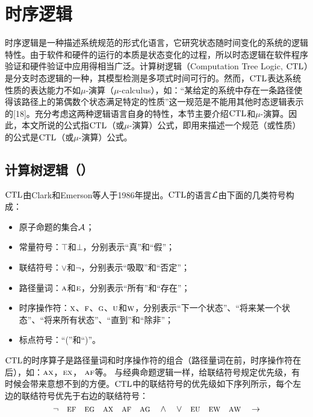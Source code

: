 \section{时序逻辑}
时序逻辑是一种描述系统规范的形式化语言，它研究状态随时间变化的系统的逻辑特性。由于软件和硬件的运行的本质是状态变化的过程，所以时态逻辑在软件程序验证和硬件验证中应用得相当广泛。计算树逻辑（Computation Tree Logic, $\textrm{CTL}$）是分支时态逻辑的一种，其模型检测是多项式时间可行的。然而，$\textrm{CTL}$表达系统性质的表达能力不如$\mu$-演算（$\mu$-calculus），如：“某给定的系统中存在一条路径使得该路径上的第偶数个状态满足特定的性质”这一规范是不能用其他时态逻辑表示的[18]。充分考虑这两种逻辑语言自身的特性，本节主要介绍$\textrm{CTL}$和$\mu$-演算。因此，本文所说的公式指$\textrm{CTL}$（或$\mu$-演算）公式，即用来描述一个规范（或性质）的公式是$\textrm{CTL}$（或$\mu$-演算）公式。

\subsection{计算树逻辑（\CTL）}
$\textrm{CTL}$由Clark和Emerson等人于1986年提出\cite{DBLP:journals/toplas/ClarkeES86}。$\textrm{CTL}$的语言${\cal L}$由下面的几类符号构成：
\begin{itemize}
	\item 原子命题的集合${\cal A}$；
	\item 常量符号：$\top$和$\bot$，分别表示“真”和“假”；
	\item 联结符号：$\vee$和$\neg$，分别表示“吸取”和“否定”；
	\item 路径量词：$\textsc{a}$和$\textsc{e}$，分别表示“所有”和“存在”；
	\item 时序操作符：$\textsc{x}$、$\textsc{f}$、$\textsc{g}$、$\textsc{u}$和$\textsc{w}$，分别表示“下一个状态”、“将来某一个状态”、“将来所有状态”、“直到”和“除非”；
	\item 标点符号：“(”和“)”。
\end{itemize}
$\textrm{CTL}$的时序算子是路径量词和时序操作符的组合（路径量词在前，时序操作符在后），如：$\textsc{a} \textsc{x}$，$\textsc{e} \textsc{x}$， $\textsc{a} \textsc{f}$等。
与经典命题逻辑一样，给联结符号规定优先级，有时候会带来意想不到的方便。$\textrm{CTL}$中的联结符号的优先级如下序列所示，每个左边的联结符号优先于右边的联结符号：
\[
\neg \quad \textsc{e}\textsc{f} \quad \textsc{e}\textsc{g} \quad \textsc{a}\textsc{x} \quad \textsc{a}\textsc{f} \quad \textsc{a}\textsc{g} \quad \wedge \quad \vee \quad \textsc{e}\textsc{u} \quad \textsc{e}\textsc{w} \quad \textsc{a}\textsc{w} \quad \rightarrow
\]

